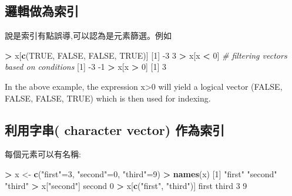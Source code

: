 \documentclass[]{book}
\newenvironment{Shaded}{\begin{snugshade}}{\end{snugshade}}
\newcommand{\CommentTok}[1]{\textcolor[rgb]{0.56,0.35,0.01}{\textit{#1}}}
\newcommand{\DecValTok}[1]{\textcolor[rgb]{0.00,0.00,0.81}{#1}}
\newcommand{\KeywordTok}[1]{\textcolor[rgb]{0.13,0.29,0.53}{\textbf{#1}}}
\newcommand{\NormalTok}[1]{#1}
\newcommand{\OperatorTok}[1]{\textcolor[rgb]{0.81,0.36,0.00}{\textbf{#1}}}
\newcommand{\OtherTok}[1]{\textcolor[rgb]{0.56,0.35,0.01}{#1}}
\newcommand{\StringTok}[1]{\textcolor[rgb]{0.31,0.60,0.02}{#1}}
\theoremstyle{definition}
\theoremstyle{definition}
\theoremstyle{definition}
\theoremstyle{remark}
\begin{document}
\subsection{邏輯做為索引}

說是索引有點誤導,可以認為是元素篩選。例如

\begin{Shaded}
\begin{Highlighting}[]
\OperatorTok{>}\StringTok{ }\NormalTok{x[}\KeywordTok{c}\NormalTok{(}\OtherTok{TRUE}\NormalTok{, }\OtherTok{FALSE}\NormalTok{, }\OtherTok{FALSE}\NormalTok{, }\OtherTok{TRUE}\NormalTok{)]}
\NormalTok{[}\DecValTok{1}\NormalTok{] }\DecValTok{-3}  \DecValTok{3}
\OperatorTok{>}\StringTok{ }\NormalTok{x[x }\OperatorTok{<}\StringTok{ }\DecValTok{0}\NormalTok{]  }\CommentTok{# filtering vectors based on conditions}
\NormalTok{[}\DecValTok{1}\NormalTok{] }\DecValTok{-3} \DecValTok{-1}
\OperatorTok{>}\StringTok{ }\NormalTok{x[x }\OperatorTok{>}\StringTok{ }\DecValTok{0}\NormalTok{]}
\NormalTok{[}\DecValTok{1}\NormalTok{] }\DecValTok{3}
\end{Highlighting}
\end{Shaded}

In the above example, the expression x\textgreater{}0 will yield a
logical vector (FALSE, FALSE, FALSE, TRUE) which is then used for
indexing.

\hypertarget{-character-vector-}{%
\subsection{利用字串( character vector)
作為索引}\label{-character-vector-}}

每個元素可以有名稱:

\begin{Shaded}
\begin{Highlighting}[]
\OperatorTok{>}\StringTok{ }\NormalTok{x <-}\StringTok{ }\KeywordTok{c}\NormalTok{(}\StringTok{"first"}\NormalTok{=}\DecValTok{3}\NormalTok{, }\StringTok{"second"}\NormalTok{=}\DecValTok{0}\NormalTok{, }\StringTok{"third"}\NormalTok{=}\DecValTok{9}\NormalTok{)}
\OperatorTok{>}\StringTok{ }\KeywordTok{names}\NormalTok{(x)}
\NormalTok{[}\DecValTok{1}\NormalTok{] }\StringTok{"first"}  \StringTok{"second"} \StringTok{"third"} 
\OperatorTok{>}\StringTok{ }\NormalTok{x[}\StringTok{"second"}\NormalTok{]}
\NormalTok{second }
\DecValTok{0} 
\OperatorTok{>}\StringTok{ }\NormalTok{x[}\KeywordTok{c}\NormalTok{(}\StringTok{"first"}\NormalTok{, }\StringTok{"third"}\NormalTok{)]}
\NormalTok{first third }
\DecValTok{3}     \DecValTok{9}
\end{Highlighting}
\end{Shaded}
\end{document}
